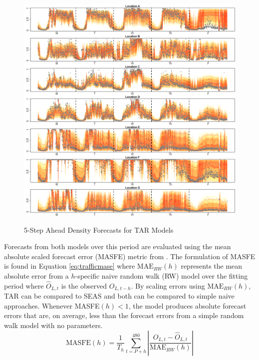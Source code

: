 \begin{figure}[ht!]
\caption{5-Step Ahead Density Forecasts for TAR Models}
\includegraphics[width=\textwidth]{DENS5Plots}
\label{fig:DENS5Plots}
\end{figure}


Forecasts from both models over this period are evaluated using the mean absolute scaled forecast error (MASFE) metric from \cite{Hyndman2006}. The formulation of MASFE is found in Equation \ref{eq:trafficmase} where $\textrm{MAE}_{RW}(h)$ represents the mean absolute error from a $h$-specific naive random walk (RW) model over the fitting period where $\widehat{O}_{L,t}$ is the observed $O_{L,t-h}$. By scaling errors using $\textrm{MAE}_{RW}(h)$, TAR can be compared to SEAS and both can be compared to simple naive approaches. Whenever MASFE$(h)<1$, the model produces absolute forecast errors that are, on average, less than the forecast errors from a simple random walk model with no parameters.
\begin{equation}
\label{eq:trafficmase}
  \textrm{MASFE}(h)=\frac{1}{T_h}\sum\limits_{t=P+h}^{480}\left|\frac{O_{L,t}-\widehat{O}_{L,t}}{\textrm{MAE}_{RW}(h)}\right|
\end{equation}

